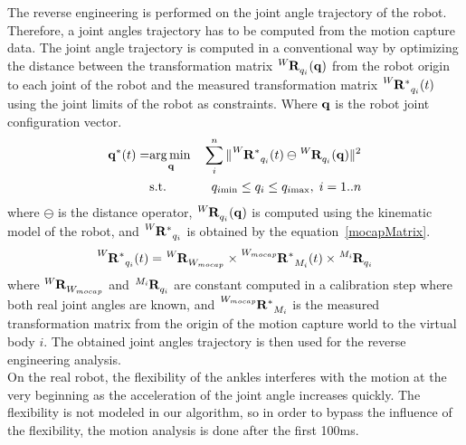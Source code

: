 \documentclass[letterpaper, 10pt, conference]{ieeeconf}      %
\begin{document}
The reverse engineering is performed on the joint angle trajectory of the robot.
Therefore, a joint angles trajectory has to be computed from the motion capture data.
The joint angle trajectory is computed in a conventional way by optimizing the distance
between the transformation matrix $\tensor[^{W}]{\mathbf{R}}{_{q_i}}(\mbf{q})$ from the 
robot origin to each joint of the robot and the measured
transformation matrix $\tensor[^{W}]{\mathbf{R^*}}{_{q_i}}(t)$ using the joint limits
of the robot as constraints. Where ${\mathbf{q}}$ is the robot joint configuration vector.
\begin{eqnarray}
  \mbf{q}^*(t) =  & \underset{\mbf{q}}\argmin & \sum_i^n \Vert \tensor[^{W}]{\mathbf{R^*}}{_{q_i}}(t) \ominus \tensor[^{W}]{\mathbf{R}}{_{q_i}}(\mbf{q}) \Vert ^2\\
    & \text{s.t.} & q_{i\mathrm{min}} \leq q_i \leq q_{i\mathrm{max}}, \; i = 1..n
  \label{mocapOpti}
\end{eqnarray}
where $\ominus$ is the distance operator, 
$\tensor[^{W}]{\mathbf{R}}{_{q_i}}(\mbf{q})$ is computed using the kinematic
model of the robot, and $\tensor[^{W}]{\mathbf{R^*}}{_{q_i}}$ is obtained by
the equation~\ref{mocapMatrix}.
\begin{equation}
\tensor[^{W}]{\mathbf{R^*}}{_{q_i}}(t) = \tensor[^{W}]{\mathbf{R}}{_{W_{mocap}}} \times \tensor[^{W_{mocap}}]{\mathbf{R^*}}{_{M_i}}(t) \times \tensor[^{M_i}]{\mathbf{R}}{_{q_i}}    
  \label{mocapMatrix}
\end{equation}
where $\tensor[^{W}]{\mathbf{R}}{_{W_{mocap}}}$ and $\tensor[^{M_i}]{\mathbf{R}}{_{q_i}}$ are constant
computed in a calibration step where both real joint angles
are known, and $\tensor[^{W_{mocap}}]{\mathbf{R^*}}{_{M_i}}$
is the measured transformation matrix from the origin of the motion capture world
to the virtual body $i$. The obtained joint angles trajectory is then used for the reverse engineering analysis.\\

On the real robot, the flexibility of the ankles interferes with the motion at the very beginning as the acceleration
of the joint angle increases quickly. The flexibility is not modeled in our algorithm, so
in order to bypass the influence of the flexibility, the motion analysis is done after the first 100ms.
\end{document}
